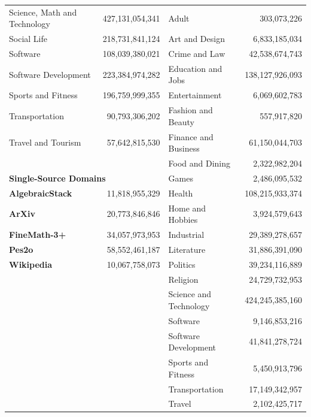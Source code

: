 \begin{table}[h]
\begin{tabular}{l r | l r}
\quad Science, Math and Technology & 427,131,054,341 & \quad Adult & 303,073,226 \\
\quad Social Life & 218,731,841,124 & \quad Art and Design & 6,833,185,034 \\
\quad Software & 108,039,380,021 & \quad Crime and Law & 42,538,674,743 \\
\quad Software Development & 223,384,974,282 & \quad Education and Jobs & 138,127,926,093 \\
\quad Sports and Fitness & 196,759,999,355 & \quad Entertainment & 6,069,602,783 \\
\quad Transportation & 90,793,306,202 & \quad Fashion and Beauty & 557,917,820 \\
\quad Travel and Tourism & 57,642,815,530 & \quad Finance and Business & 61,150,044,703 \\
 & & \quad Food and Dining & 2,322,982,204 \\
\multicolumn{2}{l|}{\textbf{Single-Source Domains}} & \quad Games & 2,486,095,532 \\
\textbf{AlgebraicStack}~\citep{azerbayev2023llemma} & 11,818,955,329 & \quad Health & 108,215,933,374 \\
\textbf{ArXiv}~\citep{azerbayev2023llemma} & 20,773,846,846 & \quad Home and Hobbies & 3,924,579,643 \\
\textbf{FineMath-3+}~\citep{allal2025smollm2smolgoesbig} & 34,057,973,953 & \quad Industrial & 29,389,278,657 \\
\textbf{Pes2o}~\citep{peS2o} & 58,552,461,187 & \quad Literature & 31,886,391,090 \\
\textbf{Wikipedia}~\citep{soldaini2024dolma} & 10,067,758,073 & \quad Politics & 39,234,116,889 \\
 & & \quad Religion & 24,729,732,953 \\
 & & \quad Science and Technology & 424,245,385,160 \\
 & & \quad Software & 9,146,853,216 \\
 & & \quad Software Development & 41,841,278,724 \\
 & & \quad Sports and Fitness & 5,450,913,796 \\
 & & \quad Transportation & 17,149,342,957 \\
 & & \quad Travel & 2,102,425,717 \\
\bottomrule
\end{tabular}
\label{tab:domain_sizes}
\end{table}